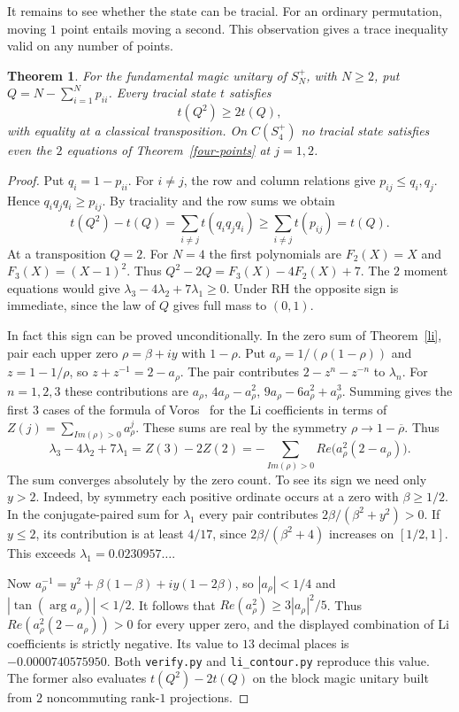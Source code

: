 \documentclass[11pt,a4paper]{article}
\newtheorem{thm}{Theorem}[section]
\begin{document}
It remains to see whether the state can be tracial. For an ordinary permutation, moving $1$ point entails moving a second. This observation gives a trace inequality valid on any number of points.

\begin{samepage}
\begin{thm}
For the fundamental magic unitary of $S_N^+$, with $N\geq2$, put $Q=N-\sum_{i=1}^N p_{ii}$. Every tracial state $t$ satisfies
\[
 t(Q^2)\geq 2t(Q),
\]
with equality at a classical transposition. On $C(S_4^+)$ no tracial state satisfies even the $2$ equations of Theorem~\textup{\ref{four-points}} at $j=1,2$.
\end{thm}
\end{samepage}
\begin{proof}
Put $q_i=1-p_{ii}$. For $i\ne j$, the row and column relations give $p_{ij}\leq q_i,q_j$. Hence $q_iq_jq_i\geq p_{ij}$. By traciality and the row sums we obtain
\[
 t(Q^2)-t(Q)=\sum_{i\ne j}t(q_iq_jq_i)
 \geq\sum_{i\ne j}t(p_{ij})=t(Q).
\]
At a transposition $Q=2$. For $N=4$ the first polynomials are $F_2(X)=X$ and $F_3(X)=(X-1)^2$. Thus $Q^2-2Q=F_3(X)-4F_2(X)+7$. The $2$ moment equations would give $\lambda_3-4\lambda_2+7\lambda_1\geq0$. Under RH the opposite sign is immediate, since the law of $Q$ gives full mass to $(0,1)$.

In fact this sign can be proved unconditionally. In the zero sum of Theorem~\ref{li}, pair each upper zero $\rho=\beta+iy$ with $1-\rho$. Put $a_\rho=1/(\rho(1-\rho))$ and $z=1-1/\rho$, so $z+z^{-1}=2-a_\rho$. The pair contributes $2-z^n-z^{-n}$ to $\lambda_n$. For $n=1,2,3$ these contributions are $a_\rho$, $4a_\rho-a_\rho^2$, $9a_\rho-6a_\rho^2+a_\rho^3$. Summing gives the first $3$ cases of the formula of Voros~\cite{voros-li} for the Li coefficients in terms of $Z(j)=\sum_{Im(\rho)>0}a_\rho^j$. These sums are real by the symmetry $\rho\to1-\overline\rho$. Thus
\[
 \lambda_3-4\lambda_2+7\lambda_1
 =Z(3)-2Z(2)=-\sum_{Im(\rho)>0}Re\big(a_\rho^2(2-a_\rho)\big).
\]
The sum converges absolutely by the zero count. To see its sign we need only $y>2$. Indeed, by symmetry each positive ordinate occurs at a zero with $\beta\geq1/2$. In the conjugate-paired sum for $\lambda_1$ every pair contributes $2\beta/(\beta^2+y^2)>0$. If $y\leq2$, its contribution is at least $4/17$, since $2\beta/(\beta^2+4)$ increases on $[1/2,1]$. This exceeds $\lambda_1=0.0230957\ldots$.

Now $a_\rho^{-1}=y^2+\beta(1-\beta)+iy(1-2\beta)$, so $|a_\rho|<1/4$ and $|\tan(\arg a_\rho)|<1/2$. It follows that $Re(a_\rho^2)\geq 3|a_\rho|^2/5$. Thus $Re(a_\rho^2(2-a_\rho))>0$ for every upper zero, and the displayed combination of Li coefficients is strictly negative. Its value to $13$ decimal places is $-0.0000740575950$. Both \texttt{verify.py} and \texttt{li\_contour.py} reproduce this value. The former also evaluates $t(Q^2)-2t(Q)$ on the block magic unitary built from $2$ noncommuting rank-$1$ projections.
\end{proof}
\end{document}
